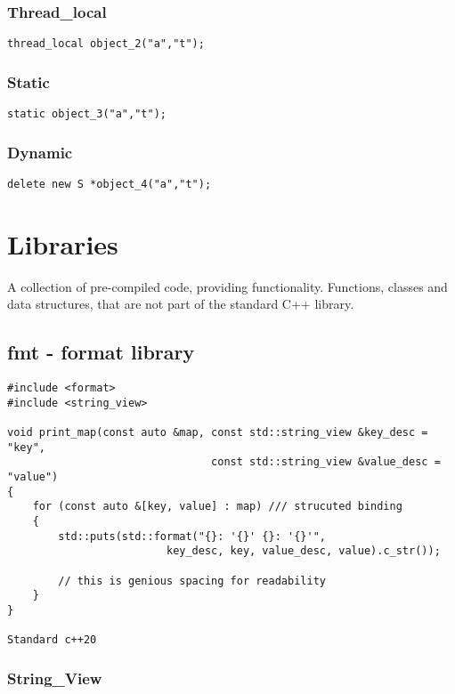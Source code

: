 \documentclass[openany]{report}
\begin{document}
\subsection{Thread\_local}
\begin{verbatim}
thread_local object_2("a","t");
\end{verbatim}

\subsection{Static}
\begin{verbatim}
static object_3("a","t");
\end{verbatim}

\subsection{Dynamic}

\begin{verbatim}
delete new S *object_4("a","t");
\end{verbatim}


\chapter{Libraries}

A collection of pre-compiled code, providing functionality. Functions, classes and data structures,
that are not part of the standard C++ library.

\section{fmt - format library}

\begin{verbatim}
#include <format>
#include <string_view>

void print_map(const auto &map, const std::string_view &key_desc = "key",
                                const std::string_view &value_desc = "value")
{
    for (const auto &[key, value] : map) /// strucuted binding
    {
        std::puts(std::format("{}: '{}' {}: '{}'",
                         key_desc, key, value_desc, value).c_str());

        // this is genious spacing for readability
    }
}

Standard c++20
\end{verbatim}
\subsection{String\_View}
\end{document}
